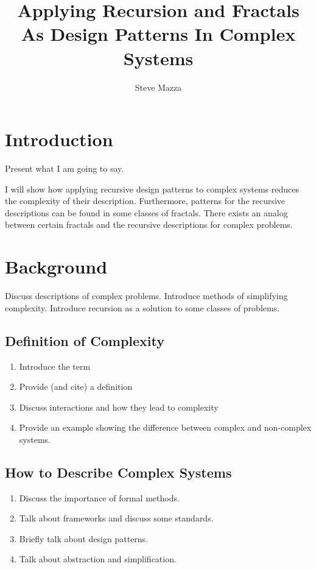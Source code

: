 \documentclass[jou,apacite]{apa6}
\title{Applying Recursion and Fractals As Design Patterns In Complex Systems}
\author{Steve Mazza}
\affiliation{Naval Postgraduate School}
\begin{document}
\maketitle    
                        
\section{Introduction}  %
Present what I am going to say.~\cite[page 112]{Mandelbrot}

I will show how applying recursive design patterns to complex systems reduces the complexity of their description.  Furthermore, patterns for the recursive descriptions can be found in some classes of fractals.  There exists an analog between certain fractals and the recursive descriptions for complex problems.

\section{Background}  %
Discuss descriptions of complex problems.  Introduce methods of simplifying complexity.  Introduce recursion as a solution to some classes of problems.
\subsection{Definition of Complexity}  %
\begin{enumerate}
  \item Introduce the term
  \item Provide (and cite) a definition
  \item Discuss interactions and how they lead to complexity
  \item Provide an example showing the difference between complex and non-complex systems.
\end{enumerate}

\subsection{How to Describe Complex Systems}  %
\begin{enumerate}
  \item Discuss the importance of formal methods.
  \item Talk about frameworks and discuss some standards.
  \item Briefly talk about design patterns.
  \item Talk about abstraction and simplification.
\end{enumerate}
\end{document}
